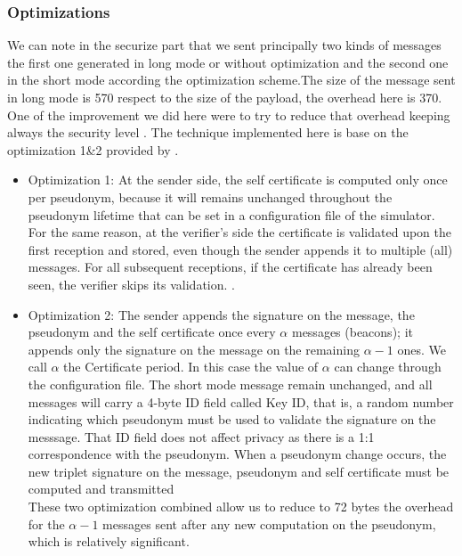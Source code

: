 \subsubsection{Optimizations}
We can note in the securize part  that we sent principally two kinds of messages the first one generated in long mode or without optimization and the second one in the short mode according the optimization scheme.The size of the message sent in long mode is 570 respect to the size of the payload, the overhead here is 370.\\
 One of the improvement we did here were to try to reduce that overhead keeping always the security level . The technique implemented  here is base on the  optimization 1\&2 provided by \cite{calandriello}. \\
\begin{itemize}
 \item Optimization 1: At the sender side, the self certificate  is computed only once per pseudonym, because it will remains unchanged throughout the pseudonym lifetime that can be set in a configuration file of the simulator. For the same reason, at the verifier's side the certificate is validated upon the first reception and stored, even though the sender appends it to multiple (all) messages. For all subsequent receptions, if the certificate has already been seen, the verifier skips its validation.
 .\\
 \item Optimization 2: The sender appends  the signature on the message, the pseudonym and the self certificate once  every $\alpha$ messages (beacons); it appends only the signature on the message  on the remaining $\alpha-1$ ones. We call $\alpha$ the Certificate period. In this case the value of $\alpha$ can change through the configuration file. The short mode message remain  unchanged, and all messages will carry a 4-byte  ID field called Key ID, that is, a random number indicating which pseudonym must be used to validate the signature on the messsage. That ID field does not affect privacy as there is a 1:1 correspondence with the pseudonym. When a pseudonym change occurs, the new triplet signature on the message, pseudonym and self certificate  must be computed and transmitted\\
  These two optimization combined allow us to reduce to 72 bytes the overhead for the $\alpha-1$ messages sent after any new computation on the pseudonym, which is relatively significant.
\end{itemize}